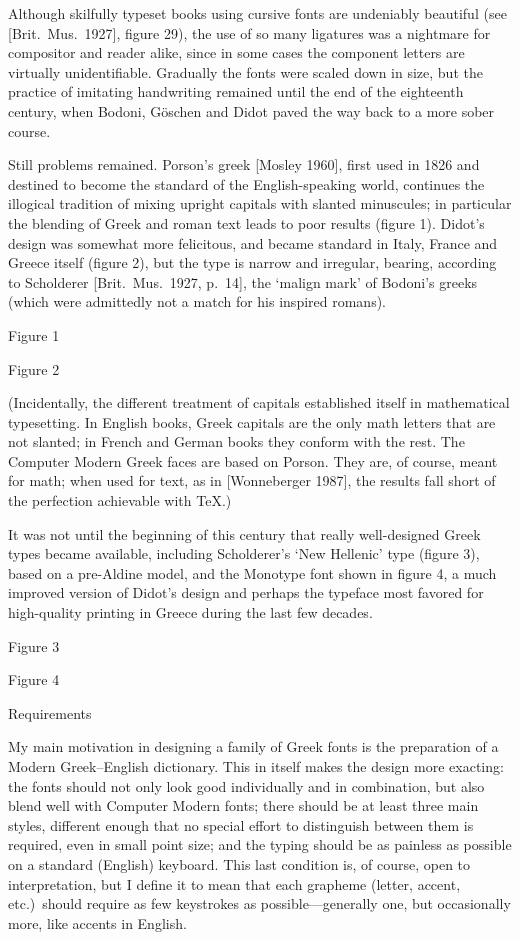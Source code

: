 Although skilfully typeset books using cursive fonts are undeniably
beautiful (see [Brit.~Mus.~1927], figure 29), the use of so many
ligatures was a nightmare for compositor and reader alike, since
in some cases the component letters are virtually unidentifiable.
Gradually the fonts were scaled down in size, but the practice
of imitating handwriting remained until the end of the eighteenth
century, when Bodoni, G\"oschen and Didot paved the way back to a
more sober course.

Still problems remained.  Porson's greek [Mosley 1960], first used
in 1826 and destined to become the standard of the English-speaking
world, continues the illogical tradition of mixing upright capitals
with slanted minuscules; in particular the blending of Greek and roman
text leads to poor results (figure 1).  Didot's design was somewhat
more felicitous, and became standard in Italy, France and Greece itself
(figure 2), but the type is narrow and irregular, bearing, according
to Scholderer [Brit.~Mus.~1927, p.~14], the `malign mark' of Bodoni's
greeks (which were admittedly not a match for his inspired romans).
\caption{\eightpoint Figure 1}

\caption{\eightpoint Figure 2}

(Incidentally, the different treatment of capitals established itself
in mathematical typesetting.  In English books, Greek capitals are the
only math letters that are not slanted; in French and German books
they conform with the rest.  The Computer Modern Greek faces are
based on Porson.  They are, of course, meant for math; when used
for text, as in [Wonneberger 1987], the results fall short of
the perfection achievable with \TeX.)

It was not until the beginning of this century that really
well-designed Greek types became available, including Scholderer's
`New Hellenic' type (figure 3), based on a pre-Aldine model,
and the Monotype font shown in figure 4, a much improved version
of Didot's design and perhaps the typeface most favored for
high-quality printing in Greece during the last few decades.
\caption{\eightpoint Figure 3}

\caption{\eightpoint Figure 4}

\heading Requirements \endheading

My main motivation in designing a family of Greek fonts is the
preparation of a Modern Greek--English dictionary.  This in itself
makes the design more exacting: the fonts should not only look good
individually and in combination, but also blend well with Computer
Modern fonts; there should be at least three main styles, different
enough that no special effort to distinguish between them is required,
even in small point size; and the typing should be as painless as
possible on a standard (English) keyboard.
This last condition is, of course, open to interpretation, but I
define it to mean that each grapheme (letter, accent, etc.)~should
require as few keystrokes as possible---generally one, but
occasionally more, like accents in English.

